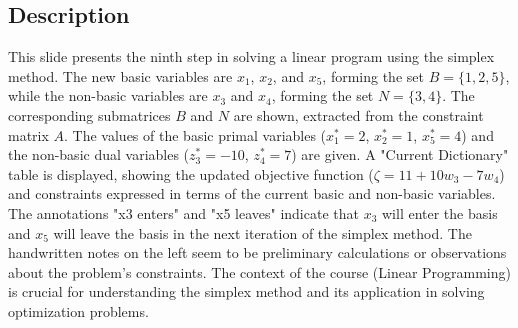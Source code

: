 \documentclass{article}%
\begin{document}
\subsection{Description}%
This slide presents the ninth step in solving a linear program using the simplex method.  The new basic variables are $x_1$, $x_2$, and $x_5$, forming the set $B = \{1, 2, 5\}$, while the non-basic variables are $x_3$ and $x_4$, forming the set $N = \{3, 4\}$. The corresponding submatrices $B$ and $N$ are shown, extracted from the constraint matrix $A$. The values of the basic primal variables ($x_1^* = 2$, $x_2^* = 1$, $x_5^* = 4$) and the non-basic dual variables ($z_3^* = -10$, $z_4^* = 7$) are given.  A "Current Dictionary" table is displayed, showing the updated objective function ($\zeta = 11 + 10w_3 - 7w_4$) and constraints expressed in terms of the current basic and non-basic variables. The annotations "x3 enters" and "x5 leaves" indicate that $x_3$ will enter the basis and $x_5$ will leave the basis in the next iteration of the simplex method. The handwritten notes on the left seem to be preliminary calculations or observations about the problem's constraints. The context of the course (Linear Programming) is crucial for understanding the simplex method and its application in solving optimization problems.%
\end{document}
